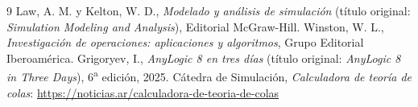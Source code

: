 \documentclass[11pt,a4paper]{article}
\begin{document}
\begin{thebibliography}{9}
 Law, A. M. y Kelton, W. D., \emph{Modelado y análisis de
simulación} (título original: \emph{Simulation Modeling and Analysis}),
Editorial McGraw-Hill.
 Winston, W. L., \emph{Investigación de operaciones:
aplicaciones y algoritmos}, Grupo Editorial Iberoamérica.
 Grigoryev, I., \emph{AnyLogic 8 en tres días} (título
original: \emph{AnyLogic 8 in Three Days}), 6\textsuperscript{a} edición,
2025.
 Cátedra de Simulación, \emph{Calculadora de teoría de
colas}: \url{https://noticias.ar/calculadora-de-teoria-de-colas}
\end{thebibliography}
\end{document}
